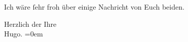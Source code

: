 \pstart
           Ich wäre{ }ſehr froh über einige Nachricht von Euch beiden.\pend
           
\pstart
           Herzlich der Ihre{\\[\baselineskip]}\spacefill\mbox{Hugo.}\pend
           \leftskip=0em{}\endnumbering{}  \newcommand{\dateiname}{L00693}\newcommand{\titel}{Hugo von Hofmannsthal an Arthur Schnitzler, 6. 7. [1897]}\newcommand{\editorInnen}{Martin Anton Müller und Gerd-Hermann Susen}
